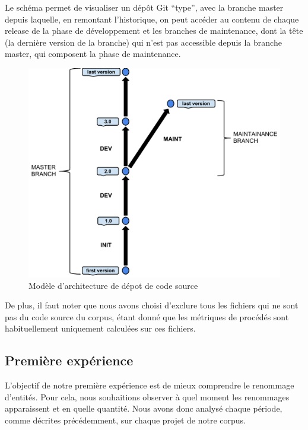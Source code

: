 Le schéma  permet de visualiser un dépôt Git ``type'', avec la branche master depuis laquelle, en remontant l'historique, on peut accéder au contenu de chaque release de la phase de développement et les branches de maintenance, dont la tête (la dernière version de la branche) qui n'est pas accessible depuis la branche master, qui composent la phase de maintenance.\\

\begin{figure}[h]
  \centering
  \includegraphics[scale=0.5]{data/figures/periods.pdf}
	\caption{Modèle d'architecture de dépot de code source}
	\label{fig:model}
\end{figure}

De plus, il faut noter que nous avons choisi d'exclure tous les fichiers qui ne sont pas du code source du corpus, étant donné que les métriques de procédés sont habituellement uniquement calculées sur ces fichiers. \\

\subsection{Première expérience}

 L'objectif de notre première expérience est de mieux comprendre le renommage d'entités. Pour cela, nous souhaitions observer à quel moment les renommages apparaissent et en quelle quantité. Nous avons donc analysé chaque période, comme décrites précédemment, sur chaque projet de notre corpus. 

